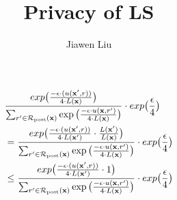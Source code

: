 \documentclass{article}
\begin{document}
\title{Privacy of LS}

\author[*]{Jiawen Liu}
\maketitle


  \begin{equation*}
  \begin{split}
  & \frac {exp\big(
  \frac{-\epsilon\cdot(\uxadj{r})}{4\cdot L(\dataobs)}
  \big)}
  {\unomalizer{\dataobs}}
  \cdot exp\big( \frac{\epsilon}{4} \big) \\
  & = \frac {exp\big(
  \frac{-\epsilon\cdot(\uxadj{r})}{4\cdot L(\dataobs')}
  \cdot   \frac{L(\dataobs')}{L(\dataobs)}
  \big)}
  {\unomalizer{\dataobs}}
  \cdot exp\big( \frac{\epsilon}{4} \big) \\
  & \leq \frac{exp\big(
  \frac{-\epsilon\cdot(\uxadj{r})}{4\cdot L(\dataobs')}
  \cdot 1
  \big)}
  {\unomalizer{\dataobs}}
  \cdot exp\big( \frac{\epsilon}{4} \big)
  \end{split}
  \end{equation*}
\end{document}
